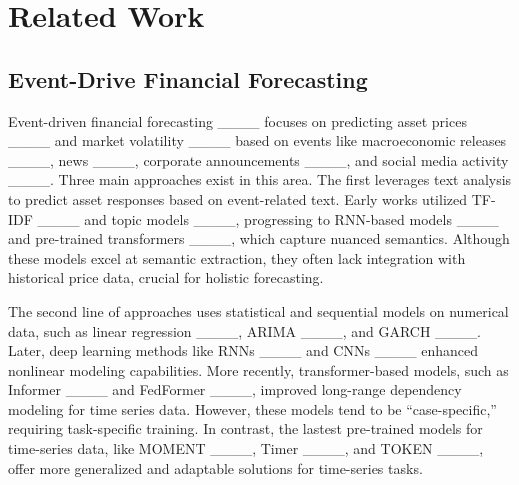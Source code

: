 \section{Related Work}
\subsection{Event-Drive Financial Forecasting} 
Event-driven financial forecasting ____ focuses on predicting asset prices ____ and market volatility ____ based on events like macroeconomic releases ____, news ____, corporate announcements ____, and social media activity ____. Three main approaches exist in this area. The first leverages text analysis to predict asset responses based on event-related text. Early works utilized TF-IDF ____ and topic models ____, progressing to RNN-based models ____ and pre-trained transformers ____, which capture nuanced semantics. Although these models excel at semantic extraction, they often lack integration with historical price data, crucial for holistic forecasting.

The second line of approaches uses statistical and sequential models on numerical data, such as linear regression ____, ARIMA ____, and GARCH ____. Later, deep learning methods like RNNs ____ and CNNs ____ enhanced nonlinear modeling capabilities. More recently, transformer-based models, such as Informer ____ and FedFormer ____, improved long-range dependency modeling for time series data. However, these models tend to be ``case-specific,'' requiring task-specific training. In contrast, the lastest pre-trained models for time-series data, like MOMENT ____, Timer ____, and TOKEN ____, offer more generalized and adaptable solutions for time-series tasks.



